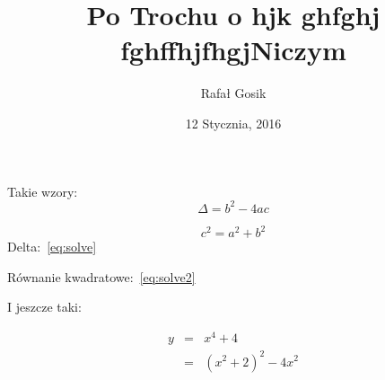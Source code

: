\documentclass[11pt]{article}
\title{Po Trochu o hjk ghfghj fghffhjfhgjNiczym }
\author{Rafał Gosik}
\date{12 Stycznia, 2016}
\begin{document}
\maketitle

\begin{center}Takie wzory:
\begin{equation} \label{eq:solve}
\Delta = b^{2}-4ac
\end{equation}

\begin{equation} \label{eq:solve2}
c^{2} = a^{2}+b^{2}
\end{equation}
Delta:~\ref{eq:solve}

Równanie kwadratowe:~\ref{eq:solve2}

\centerline{I jeszcze taki:}
\begin{eqnarray*}
 y &=& x^4 + 4      \nonumber \\
   &=& (x^2+2)^2 -4x^2 \nonumber \\
\end{eqnarray*}


\end{center}
\end{document}
